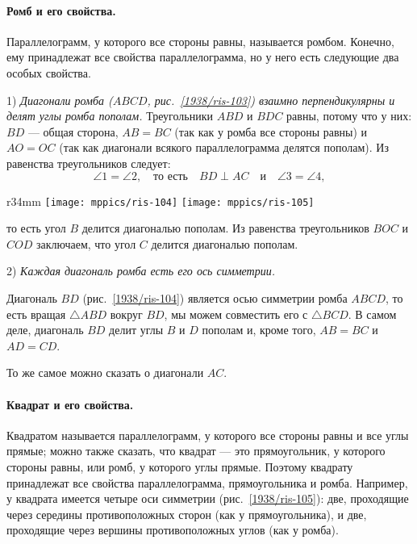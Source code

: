 \paragraph{Ромб и его свойства.}\label{1938/93}
Параллелограмм, у которого все стороны равны, называется ромбом.
Конечно, ему принадлежат все свойства параллелограмма, но у него есть следующие два особых свойства.

1) \emph{Диагонали ромба \emph{($ABCD$, рис.~\ref{1938/ris-103})} взаимно перпендикулярны и делят углы ромба пополам.}
Треугольники $ABD$ и $BDC$ равны, потому что у них:
$BD$ — общая сторона, $AB=BC$ (так как у ромба все стороны равны) и $AO=OC$ (так как диагонали всякого параллелограмма делятся пополам).
Из равенства треугольников следует:
\[\angle 1 =\angle 2,
\quad
\text{то есть}
\quad
BD\perp AC
\quad
\text{и}
\quad
\angle 3 =\angle 4,
\]

\begin{wrapfigure}{r}{34mm}
\vskip-0mm
\centering
\texttt{[image: mppics/ris-104]}
\label{1938/ris-104}
\bigskip
\texttt{[image: mppics/ris-105]}
\caption{}\label{1938/ris-105}
\end{wrapfigure}

\noindent
то есть угол $B$ делится диагональю пополам.
Из равенства треугольников $BOC$ и $COD$ заключаем, что угол $C$ делится диагональю пополам.

2) \emph{Каждая диагональ ромба есть его ось симметрии.}


Диагональ $BD$ (рис.~\ref{1938/ris-104}) является осью симметрии ромба $ABCD$,
то есть вращая $\triangle ABD$ вокруг $BD$, мы можем совместить его с $\triangle BCD$.
В самом деле, диагональ $BD$ делит углы $B$ и $D$ пополам и, кроме того, $AB=BC$ и $AD=CD$.

То же самое можно сказать о диагонали $AC$.

\paragraph{Квадрат и его свойства.}\label{1938/94}
Квадратом называется параллелограмм, у которого все стороны равны и все углы прямые;
можно также сказать, что квадрат — это прямоугольник, у которого стороны равны, или ромб, у которого углы прямые.
Поэтому квадрату принадлежат все свойства параллелограмма, прямоугольника и ромба.
Например, у квадрата имеется четыре оси симметрии (рис.~\ref{1938/ris-105}):
две, проходящие через середины противоположных сторон (как у прямоугольника), и две, проходящие через вершины противоположных углов (как у ромба).

